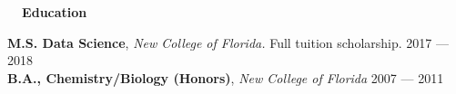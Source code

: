 \documentclass[a4paper,12pt]{article}
\newcommand{\resheading}[1]{{\vspace*{.001in} \colorbox{mygrey}{\begin{minipage}{\textwidth}{\textmd{\large \textbf{#1} \vphantom{p\^{E}}}}\end{minipage}}} }
\newcommand{\ressubheading}[4]{
        \textbf{#1} \hfill #2\\
        \textit{#3} \hfill #4 \\}
\begin{document}




\resheading{~~Education}

\textbf{M.S. Data Science}, \textit{New College of Florida.} Full tuition scholarship. \hfill 2017 --- 2018\\
\textbf{B.A., Chemistry/Biology (Honors)}, \textit{New College of Florida} \hfill 2007 --- 2011

\end{document}
